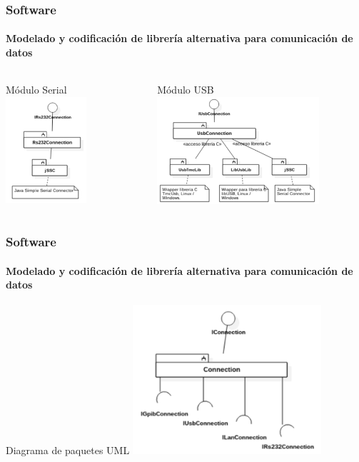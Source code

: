 \documentclass[xcolor=pdftext, table]{beamer}
\begin{document}
	\begin{frame}	
		\frametitle{Software}
		\framesubtitle{Modelado y codificación de librería alternativa para comunicación de datos}

		\begin{columns}
	
			\begin{column}{3cm}
				\begin{block}{Módulo Serial}
					\includegraphics[width=3cm]{Imagenes/Rs232ConnectionPackageUml.pdf} 
				\end{block}			
			\end{column}
		
			\begin{column}{6cm}
				\begin{block}{Módulo USB}
					\includegraphics[width=6cm]{Imagenes/UsbConnectionPackageUml.pdf}	
				\end{block}				
			\end{column}	
	
		\end{columns}

	\end{frame}

	\begin{frame}	
		\frametitle{Software}
		\framesubtitle{Modelado y codificación de librería alternativa para comunicación de datos}

		\begin{block}{Diagrama de paquetes UML}
			\centering
			\includegraphics[width=7cm]{Imagenes/ConnectionPackageUml.pdf}
		\end{block}

	\end{frame}
\end{document}
